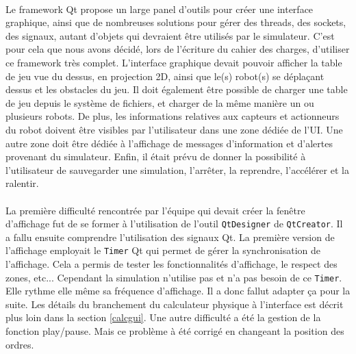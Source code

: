 \paragraph{}

Le framework Qt propose un large panel d'outils pour créer une interface graphique, ainsi que de nombreuses solutions pour gérer des threads, des sockets, des signaux, autant d'objets qui devraient être utilisés par le simulateur. C'est pour cela que nous avons décidé, lors de l'écriture du cahier des charges, d'utiliser ce framework très complet.
L'interface graphique devait pouvoir afficher la table de jeu vue du dessus, en projection 2D, ainsi que le(s) robot(s) se déplaçant dessus et les obstacles du jeu.
Il doit également être possible de charger une table de jeu depuis le système de fichiers, et charger de la même manière un ou plusieurs robots.
De plus, les informations relatives aux capteurs et actionneurs du robot doivent être visibles par l'utilisateur dans une zone dédiée de l'UI.
Une autre zone doit être dédiée à l'affichage de messages d'information et d'alertes provenant du simulateur.
Enfin, il était prévu de donner la possibilité à l'utilisateur de sauvegarder une simulation, l'arrêter, la reprendre, l'accélérer et la ralentir.

\paragraph{}

La première difficulté rencontrée par l'équipe qui devait créer la fenêtre d'affichage fut de se former à l'utilisation de l'outil \texttt{QtDesigner} de \texttt{QtCreator}. Il a fallu ensuite comprendre l'utilisation des signaux Qt. La première version de l'affichage employait le \texttt{Timer} Qt qui permet de gérer la synchronisation de l'affichage. Cela a permis de tester les fonctionnalités d'affichage, le respect des zones, etc... Cependant la simulation n'utilise pas et n'a pas besoin de ce \texttt{Timer}. Elle rythme elle même sa fréquence d'affichage. Il a donc fallut adapter ça pour la suite. Les détails du branchement du calculateur physique à l'interface est décrit plus loin dans la section \ref{calcgui}. Une autre difficulté a été la gestion de la fonction play/pause. Mais ce problème à été corrigé en changeant la position des ordres.

